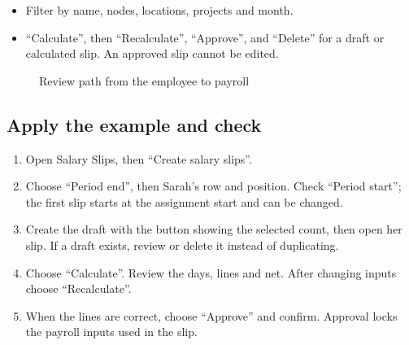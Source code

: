 \begin{itemize}
  \item Filter by name, nodes, locations, projects and month.
  \item “Calculate”, then “Recalculate”, “Approve”, and “Delete” for a draft or calculated slip. An approved slip cannot be edited.
\end{itemize}

\begin{figure}[H]
\centering
{}
\rclegend
\caption{Review path from the employee to payroll}
\label{fig:hr-review-flow}
\end{figure}

\subsection{Apply the example and check}

\begin{enumerate}
  \item Open Salary Slips, then “Create salary slips”.
  \item Choose “Period end”, then Sarah's row and position. Check “Period start”; the first slip starts at the assignment start and can be changed.
  \item Create the draft with the button showing the selected count, then open her slip. If a draft exists, review or delete it instead of duplicating.
  \item Choose “Calculate”. Review the days, lines and net. After changing inputs choose “Recalculate”.
  \item When the lines are correct, choose “Approve” and confirm. Approval locks the payroll inputs used in the slip.
\end{enumerate}

